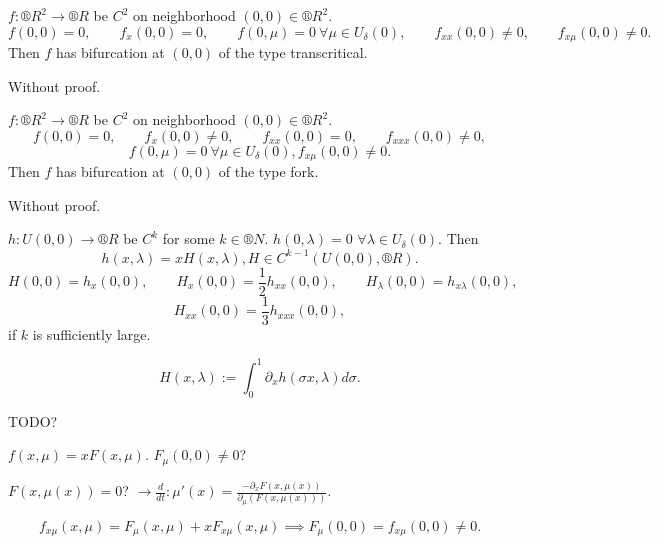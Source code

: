 \documentclass[12pt]{article}					%
\begin{document}
\begin{veta}
	$f: ®R^2 \rightarrow ®R$ be $C^2$ on neighborhood $(0, 0) \in ®R^2$.
	$$ f(0, 0) = 0, \qquad f_x(0, 0) = 0, \qquad f(0, \mu) = 0\ \forall \mu \in U_\delta(0), \qquad f_{xx}(0, 0) ≠ 0, \qquad f_{x\mu}(0, 0) ≠ 0. $$
	Then $f$ has bifurcation at $(0, 0)$ of the type transcritical.

	\begin{dukazin}
		Without proof.
	\end{dukazin}
\end{veta}

\begin{veta}
	$f: ®R^2 \rightarrow ®R$ be $C^2$ on neighborhood $(0, 0) \in ®R^2$.
	$$ f(0, 0) = 0, \qquad f_x(0, 0) ≠ 0, \qquad f_{xx}(0, 0) = 0, \qquad f_{xxx}(0, 0) ≠ 0, $$
	$$ f(0, \mu) = 0\ \forall \mu \in U_\delta(0), f_{x\mu}(0, 0) ≠ 0. $$
	Then $f$ has bifurcation at $(0, 0)$ of the type fork.

	\begin{dukazin}
		Without proof.
	\end{dukazin}
\end{veta}

\begin{lemma}
	$h: U(0, 0) \rightarrow ®R$ be $C^k$ for some $k \in ®N$. $h(0, \lambda) = 0$ $\forall \lambda \in U_\delta(0)$. Then
	$$ h(x, \lambda) = x H(x, \lambda), H \in C^{k - 1}(U(0, 0), ®R). $$
	$$ H(0, 0) = h_x(0, 0), \qquad H_x(0, 0) = \frac{1}{2} h_{xx}(0, 0), \qquad H_\lambda(0, 0) = h_{x\lambda}(0, 0), $$
	$$ H_{xx}(0, 0) = \frac{1}{3} h_{xxx}(0, 0), $$
	if $k$ is sufficiently large.

	\begin{dukazin}
		$$ H(x, \lambda) := \int_0^1 \partial_x h(\sigma x, \lambda) d\sigma. $$
	\end{dukazin}
\end{lemma}


TODO?

\begin{dukaz}
	$f(x, \mu) = x F(x, \mu)$. $F_\mu(0, 0) ≠ 0$?

	$F(x, \mu(x)) = 0$? $\rightarrow \frac{d}{dt}: \mu'(x) = \frac{-\partial_x F(x, \mu(x))}{\partial_\mu(F(x, \mu(x)))}$.

	$$ f_{x\mu}(x, \mu) = F_\mu(x, \mu) + x F_{x\mu}(x, \mu) \implies F_\mu(0, 0) = f_{x\mu}(0, 0) ≠ 0. $$
%
\end{dukaz}
\end{document}
